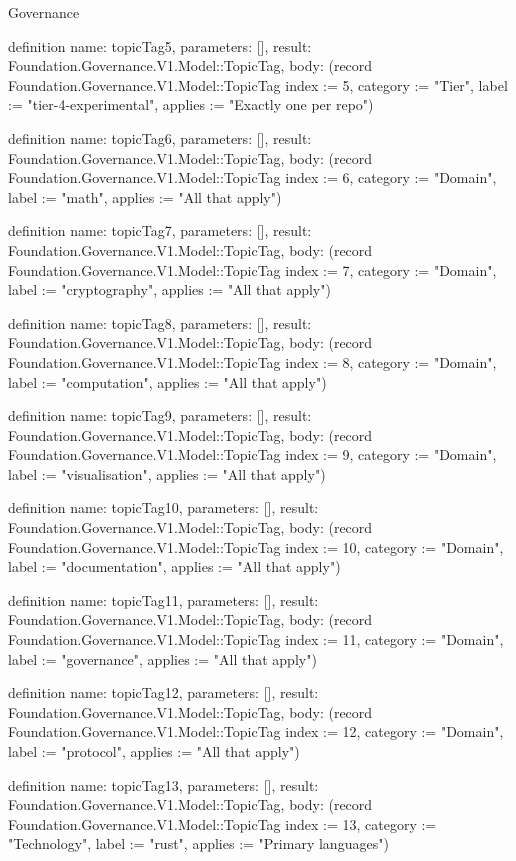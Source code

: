 \begin{lexlean}{Governance}
\begin{semanticmodule}
definition{
  name: topicTag5,
  parameters: [],
  result: Foundation.Governance.V1.Model::TopicTag,
  body: (record Foundation.Governance.V1.Model::TopicTag {index := 5, category := "Tier", label := "tier-4-experimental", applies := "Exactly one per repo"})
}

definition{
  name: topicTag6,
  parameters: [],
  result: Foundation.Governance.V1.Model::TopicTag,
  body: (record Foundation.Governance.V1.Model::TopicTag {index := 6, category := "Domain", label := "math", applies := "All that apply"})
}

definition{
  name: topicTag7,
  parameters: [],
  result: Foundation.Governance.V1.Model::TopicTag,
  body: (record Foundation.Governance.V1.Model::TopicTag {index := 7, category := "Domain", label := "cryptography", applies := "All that apply"})
}

definition{
  name: topicTag8,
  parameters: [],
  result: Foundation.Governance.V1.Model::TopicTag,
  body: (record Foundation.Governance.V1.Model::TopicTag {index := 8, category := "Domain", label := "computation", applies := "All that apply"})
}

definition{
  name: topicTag9,
  parameters: [],
  result: Foundation.Governance.V1.Model::TopicTag,
  body: (record Foundation.Governance.V1.Model::TopicTag {index := 9, category := "Domain", label := "visualisation", applies := "All that apply"})
}

definition{
  name: topicTag10,
  parameters: [],
  result: Foundation.Governance.V1.Model::TopicTag,
  body: (record Foundation.Governance.V1.Model::TopicTag {index := 10, category := "Domain", label := "documentation", applies := "All that apply"})
}

definition{
  name: topicTag11,
  parameters: [],
  result: Foundation.Governance.V1.Model::TopicTag,
  body: (record Foundation.Governance.V1.Model::TopicTag {index := 11, category := "Domain", label := "governance", applies := "All that apply"})
}

definition{
  name: topicTag12,
  parameters: [],
  result: Foundation.Governance.V1.Model::TopicTag,
  body: (record Foundation.Governance.V1.Model::TopicTag {index := 12, category := "Domain", label := "protocol", applies := "All that apply"})
}

definition{
  name: topicTag13,
  parameters: [],
  result: Foundation.Governance.V1.Model::TopicTag,
  body: (record Foundation.Governance.V1.Model::TopicTag {index := 13, category := "Technology", label := "rust", applies := "Primary languages"})
}


\end{semanticmodule}
\end{lexlean}
